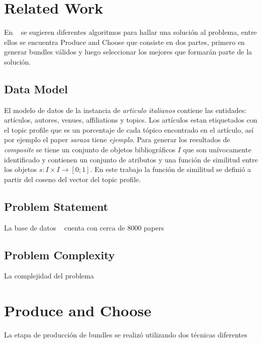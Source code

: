 \section{Related Work}
En ~\cite{compositeRetrival} se sugieren diferentes algoritmos para hallar una solución al problema, entre ellos se encuentra Produce and Choose que consiste en dos partes, primero en generar bundles válidos y luego seleccionar los mejores que formarán parte de la solución.
\subsection{Data Model}\label{body-data-model}
El modelo de datos de la instancia de \textit{articulo italianos} contiene las entidades: artículos, autores, venues, affiliations y topics. Los artículos estan etiquetados con el topic profile que es un porcentaje de cada tópico encontrado en el artículo, así por ejemplo el paper \textit{saraza} tiene \textit{ejemplo}. Para generar los resultados de \textit{composite} se tiene un conjunto de objetos bibliográficos $I$ que son unívocamente identificado y contienen un conjunto de atributos y una función de similitud entre los objetos $ s: I \times I \rightarrow [0;1]$. En este trabajo la función de similitud se definió a partir del coseno del vector del topic profile.\\
\subsection{Problem Statement}
La base de datos ~\cite{dataDrive} cuenta con cerca de 8000 papers 
\subsection{Problem Complexity}
La complejidad del problema
\section{Produce and Choose}
La etapa de producción de bundles se realizó utilizando dos técnicas diferentes
